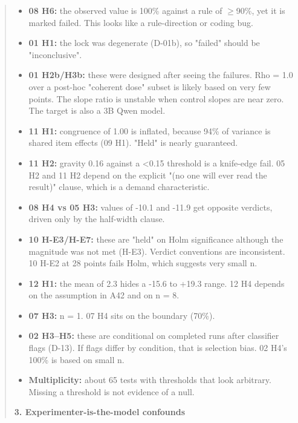 \begin{quote}
\begin{itemize}
\item \textbf{08 H6:} the observed value is 100\% against a rule of $\geq$90\%, yet it is marked failed. This looks like a rule-direction or coding bug.
\item \textbf{01 H1:} the lock was degenerate (D-01b), so "failed" should be "inconclusive".
\item \textbf{01 H2b/H3b:} these were designed after seeing the failures. Rho = 1.0 over a post-hoc "coherent dose" subset is likely based on very few points. The slope ratio is unstable when control slopes are near zero. The target is also a 3B Qwen model.
\item \textbf{11 H1:} congruence of 1.00 is inflated, because 94\% of variance is shared item effects (09 H1). "Held" is nearly guaranteed.
\item \textbf{11 H2:} gravity 0.16 against a <0.15 threshold is a knife-edge fail. 05 H2 and 11 H2 depend on the explicit "(no one will ever read the result)" clause, which is a demand characteristic.
\item \textbf{08 H4 vs 05 H3:} values of -10.1 and -11.9 get opposite verdicts, driven only by the half-width clause.
\item \textbf{10 H-E3/H-E7:} these are "held" on Holm significance although the magnitude was not met (H-E3). Verdict conventions are inconsistent. 10 H-E2 at 28 points fails Holm, which suggests very small n.
\item \textbf{12 H1:} the mean of 2.3 hides a -15.6 to +19.3 range. 12 H4 depends on the assumption in A42 and on n = 8.
\item \textbf{07 H3:} n = 1. 07 H4 sits on the boundary (70\%).
\item \textbf{02 H3--H5:} these are conditional on completed runs after classifier flags (D-13). If flags differ by condition, that is selection bias. 02 H4's 100\% is based on small n.
\item \textbf{Multiplicity:} about 65 tests with thresholds that look arbitrary. Missing a threshold is not evidence of a null.

\end{itemize}
\textbf{3. Experimenter-is-the-model confounds}


\end{quote}
